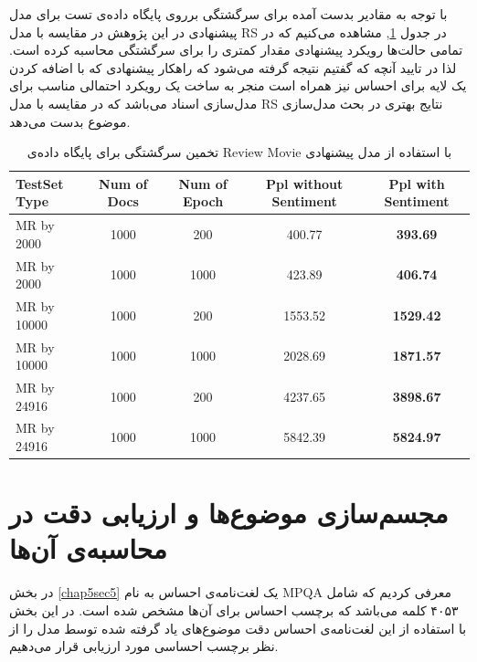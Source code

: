  با توجه به مقادير بدست آمده برای سرگشتگی برروی پایگاه داده‌ی تست برای مدل پیشنهادی در این پژوهش در مقايسه با مدل 
RS
در جدول 
\ref{chap5-tb2},
مشاهده می‌کنيم که در تمامی حالت‌ها رويکرد پيشنهادی مقدار کمتری را برای سرگشتگی محاسبه کرده است. لذا در تایید آنچه که گفتیم نتيجه گرفته 
می‌شود که راهکار پيشنهادی که با اضافه کردن يک لايه برای احساس نيز همراه است منجر به ساخت يک رويکرد احتمالی مناسب‌ برای مدل‌سازی اسناد 
می‌باشد که در مقایسه با مدل 
RS
نتایج بهتری در بحث مدل‌سازی موضوع بدست می‌دهد.

\begin{table}[!t]
	\centering
	\begin{latin}
	\begin{tabular}{|l|c|c|c|c|}
		\hline
		TestSet Type & Num of Docs & Num of Epoch & Ppl without Sentiment & Ppl with Sentiment \\
		\hline
		MR by 2000 & 1000 & 200 & 400.77 & \textbf{393.69 }\\
		\hline
		MR by 2000 & 1000 & 1000 & 423.89 & \textbf{406.74} \\
		\hline
		MR by 10000 & 1000 & 200 & 1553.52 & \textbf{1529.42} \\
		\hline
		MR by 10000 & 1000 & 1000 & 2028.69 & \textbf{1871.57} \\
		\hline
		MR by 24916 & 1000 & 200 & 4237.65 & \textbf{3898.67}\\
		\hline
		MR by 24916 & 1000 & 1000 & 5842.39 & \textbf{5824.97}\\
		\hline
	\end{tabular}
	\end{latin}
	\caption{تخمین سرگشتگی برای پایگاه داده‌ی Review Movie با استفاده از مدل پیشنهادی}
	\label{chap5-tb2}
\end{table}

\section{مجسم‌سازی موضوع‌ها و ارزیابی دقت در محاسبه‌ی آن‌ها}
\label{chap5sec8}
در بخش
\ref{chap5sec5}
یک لغت‌نامه‌ی احساس به نام
MPQA
معرفی‌ کردیم که شامل ۴۰۵۳ کلمه می‌باشد که برچسب احساس برای آن‌ها مشخص شده است. در این بخش با استفاده از این لغت‌نامه‌ی احساس دقت موضوع‌های یاد گرفته شده توسط مدل را از نظر برچسب احساسی مورد ارزیابی قرار می‌‌دهیم.

